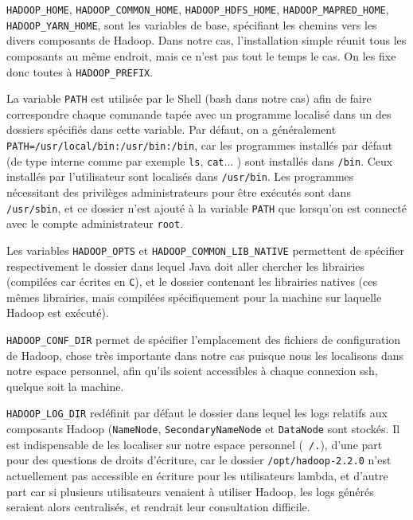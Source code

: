 \par \texttt{HADOOP\_HOME}, \texttt{HADOOP\_COMMON\_HOME},
\texttt{HADOOP\_HDFS\_HOME}, \texttt{HADOOP\_MAPRED\_HOME}, \\ \texttt{HADOOP\_YARN\_HOME}, sont les variables de base, spécifiant les chemins vers les divers composants de Hadoop. Dans notre cas, l'installation simple réunit tous les composants au même endroit, mais ce n'est pas tout le temps le cas. On les fixe donc toutes à \texttt{HADOOP\_PREFIX}.

\par La variable \texttt{PATH} est utilisée par le Shell (bash dans notre cas) afin de faire correspondre chaque commande tapée avec un programme localisé dans un des dossiers spécifiés dans cette variable. Par défaut, on a généralement \texttt{PATH=/usr/local/bin:/usr/bin:/bin}, car les programmes installés par défaut (de type interne comme par exemple \texttt{ls}, \texttt{cat}... ) sont installés dans \texttt{/bin}. Ceux installés par l'utilisateur sont localisés dans \texttt{/usr/bin}. Les programmes nécessitant des privilèges administrateurs pour être exécutés sont dans \texttt{/usr/sbin}, et ce dossier n'est ajouté à la variable \texttt{PATH} que lorsqu'on est connecté avec le compte administrateur \texttt{root}.

\par Les variables \texttt{HADOOP\_OPTS} et \texttt{HADOOP\_COMMON\_LIB\_NATIVE} permettent de spécifier respectivement le dossier dans lequel Java doit aller chercher les librairies (compilées car écrites en \texttt{C}), et le dossier contenant les librairies natives (ces mêmes librairies, mais compilées spécifiquement pour la machine sur laquelle Hadoop est exécuté).

\par \texttt{HADOOP\_CONF\_DIR} permet de spécifier l'emplacement des fichiers de configuration de Hadoop, chose très importante dans notre cas puisque nous les localisons dans notre espace personnel, afin qu'ils soient accessibles à chaque connexion ssh, quelque soit la machine.

\par \texttt{HADOOP\_LOG\_DIR} redéfinit par défaut le dossier dans lequel les logs relatifs aux composants Hadoop (\texttt{NameNode}, \texttt{SecondaryNameNode} et \texttt{DataNode} sont stockés. Il est indispensable de les localiser sur notre espace personnel (\texttt{~/.}), d'une part pour des questions de droits d'écriture, car le dossier \texttt{/opt/hadoop-2.2.0} n'est actuellement pas accessible en écriture pour les utilisateurs lambda, et d'autre part car si plusieurs utilisateurs venaient à utiliser Hadoop, les logs générés seraient alors centralisés, et rendrait leur consultation difficile.

